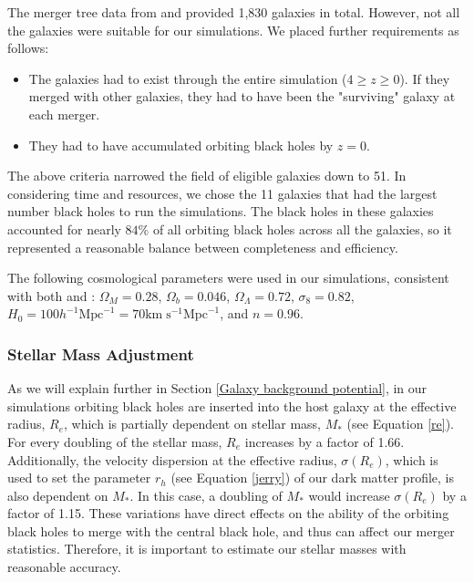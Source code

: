 \documentclass[fleqn,usenatbib,useAMS]{mnras}
\begin{document}
The merger tree data from \citet{2012MNRAS.425..641L} and \citet{2015ApJ...799..178K} provided 1,830 galaxies in total.  However, not all the galaxies were suitable for our simulations.  We placed further requirements as follows:
\begin{itemize}
\item The galaxies had to exist through the entire simulation ($4\geq z \geq 0$).  If they merged with other galaxies, they had to have been the "surviving" galaxy at each merger.
\item They had to have accumulated orbiting black holes by $z = 0$.
\end{itemize}

The above criteria narrowed the field of eligible galaxies down to 51.  In considering time and resources, we chose the 11 galaxies that had the largest number black holes to run the simulations.  The black holes in these galaxies accounted for nearly $84{\%}$ of all orbiting black holes across all the galaxies, so it represented a reasonable balance between completeness and efficiency.

The following cosmological parameters were used in our simulations, consistent with both \citet{2012MNRAS.425..641L} and \citet{2015ApJ...799..178K}:   $\Omega_M = 0.28$, $\Omega_b = 0.046$, $\Omega_\Lambda = 0.72$, $\sigma_8 = 0.82$, $H_0 = 100h^{-1}\mathrm{Mpc}^{-1} = 70 \mathrm{km}\;\mathrm{s}^{-1} \mathrm{Mpc}^{-1}$, and $n = 0.96$.

\subsubsection{Stellar Mass Adjustment}
As we will explain further in Section \ref{Galaxy background potential}, in our simulations orbiting black holes are inserted into the host galaxy at the effective radius, $R_e$, which is partially dependent on stellar mass, $M_*$ (see Equation \ref{re}).  For every doubling of the stellar mass, $R_e$ increases by a factor of 1.66.  Additionally, the velocity dispersion at the effective radius, $\sigma(R_e)$, which is used to set the parameter $r_h$ (see Equation \ref{jerry}) of our dark matter profile, is also dependent on $M_*$.  In this case, a doubling of $M_*$ would increase $\sigma(R_e)$ by a factor of 1.15.  These variations have direct effects on the ability of the orbiting black holes to merge with the central black hole, and thus can affect our merger statistics.  Therefore, it is important to estimate our stellar masses with reasonable accuracy.
\end{document}
